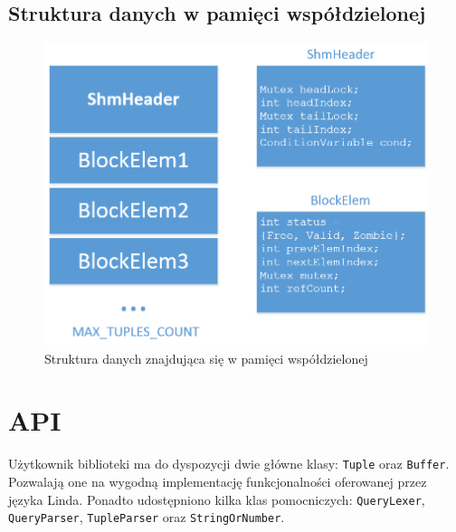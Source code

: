 \documentclass[a4paper]{article}
\begin{document}
	\subsection{Struktura danych w pamięci współdzielonej}
    \label{struct}
	\begin{figure}[H]
	\centering
	\includegraphics[width=130mm]{images/struct.png}
	\caption{Struktura danych znajdująca się w pamięci współdzielonej}
	\end{figure}


	\section{API}
	Użytkownik biblioteki ma do dyspozycji dwie główne klasy: \texttt{Tuple} oraz \texttt{Buffer}. Pozwalają one na wygodną implementację funkcjonalności oferowanej przez języka Linda. Ponadto udostępniono kilka klas pomocniczych: \texttt{QueryLexer}, \texttt{QueryParser}, \texttt{TupleParser} oraz \texttt{StringOrNumber}.
\end{document}

